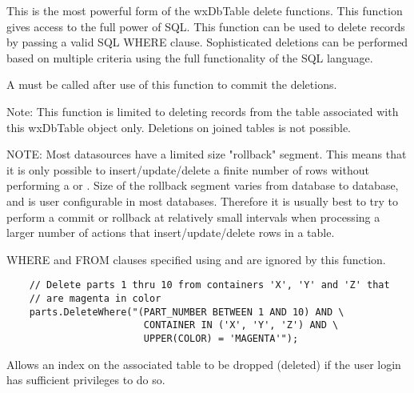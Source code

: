 
This is the most powerful form of the wxDbTable delete functions.  This
function gives access to the full power of SQL.  This function can be used
to delete records by passing a valid SQL WHERE clause.  Sophisticated
deletions can be performed based on multiple criteria using the full
functionality of the SQL language.

A  must be called after use of
this function to commit the deletions.

Note: This function is limited to deleting records from the table associated
with this wxDbTable object only.  Deletions on joined tables is not possible.

NOTE: Most datasources have a limited size "rollback" segment.  This means
that it is only possible to insert/update/delete a finite number of rows
without performing a  or
.  Size of the rollback
segment varies from database to database, and is user configurable in
most databases.  Therefore it is usually best to try to perform a commit
or rollback at relatively small intervals when processing a larger number
of actions that insert/update/delete rows in a table.

WHERE and FROM clauses specified using 
and  are ignored by
this function.


\begin{verbatim}
    // Delete parts 1 thru 10 from containers 'X', 'Y' and 'Z' that
    // are magenta in color
    parts.DeleteWhere("(PART_NUMBER BETWEEN 1 AND 10) AND \
                        CONTAINER IN ('X', 'Y', 'Z') AND \
                        UPPER(COLOR) = 'MAGENTA'");
\end{verbatim}


\label{wxdbtabledropindex}


Allows an index on the associated table to be dropped (deleted) if the user
login has sufficient privileges to do so.



